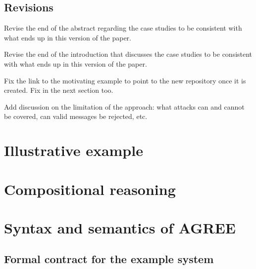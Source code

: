 \documentclass[global,twocolumn,keeplastbox]{svjour}
\newif\ifREVISIONS
\begin{document}
\subsection{Revisions}
\begin{compactitem}
  \item Revise the end of the abstract regarding the case studies to be consistent with what ends up in this version of the paper.
  \item Revise the end of the introduction that discusses the case studies to be consistent with what ends up in this version of the paper.
  \item Fix the link to the motivating example to point to the new repository once it is created. Fix in the next section too.
  \item Add discussion on the limitation of the approach: what attacks can and cannot be covered, can valid messages be rejected, etc.
\end{compactitem}
\fi

\section{Illustrative example}
\label{sec:example}


\section{Compositional reasoning}
\label{sec:agree}


\section{Syntax and semantics of AGREE}
\label{agree-semantics}


\subsection{Formal contract for the example system}


\ifREVISIONS
\subsection{Revisions}
\begin{compactitem}
  \item \sout{Add in the AGREE specification for the system}
  \item \sout{Add in the AGREE verification conditions (e.g., similar to those in the Scheduled Components NFM submission)}
  \item \sotu{Add reference to the Liskov principle of safe-substitution when stating that the system contract is a sound abstraction of the implementation.}
  \item Add back in a few sentences on the contract for the filter since those have been removed with the addition of the formal definitions.
\end{compactitem}
\fi
\end{document}
